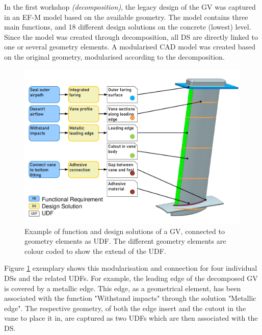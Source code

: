 \documentclass[aerospace,article,submit,moreauthors,pdftex]{Definitions/mdpi}
\newcommand{\revision}[1]{{{\color{ForestGreen}{{#1}}\color{black}}
    }{\ignorespaces}}
\begin{document}

In the first workshop \textit{(decomposition)}, the legacy design of the \ac{GV} was captured in an \ac{EF-M} model based on the available geometry.
The model contains three main functions, and 18 different design solutions on the concrete (lowest) level.
Since the model was created through decomposition, all \ac{DS} are directly linked to one or several geometry elements.
A modularised CAD model was created based on the original geometry, modularised according to the decomposition.


\begin{figure}[ht]
    \centering
    \includegraphics[width=\textwidth]{figures/pdf/ogvDecomp.pdf}
    \caption{Example of function and design solutions of a GV, connected to geometry elements as UDF.
    The different geometry elements are colour coded to show the extend of the UDF.}
    \label{fig:decompositionExample}
\end{figure}

Figure \ref{fig:decompositionExample} exemplary shows this modularisation and connection for four individual \acp{DS} and the related \acp{UDF}.
For example, the leading edge of the decomposed \ac{GV} is covered by a metallic edge.
This \revision{metallic}  edge, as a geometrical element, has been associated with the function "Withstand impacts" through the solution "Metallic  edge".
The respective geometry, of both the edge insert and the cutout in the vane to place it in, are captured as two \acp{UDF} which are then associated with the \ac{DS}.
\end{document}
